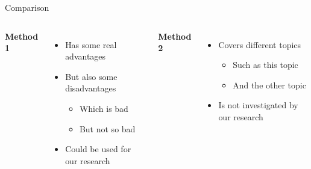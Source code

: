 \documentclass[english,american,german,aspectratio=43]{beamer}
\begin{document}
\begin{frame}{Comparison}

  \begin{columns}[t]


    \textbf{Method 1}

    \begin{itemize}
      \item Has some real advantages
      \item But also some disadvantages

        \begin{itemize}
          \item Which is bad
          \item But not so bad
        \end{itemize}
      \item Could be used for our research
    \end{itemize}


    \textbf{Method 2}

    \begin{itemize}
      \item Covers different topics

        \begin{itemize}
          \item Such as this topic
          \item And the other topic
        \end{itemize}
      \item Is not investigated by our research
    \end{itemize}
  \end{columns}

\end{frame}
\end{document}
